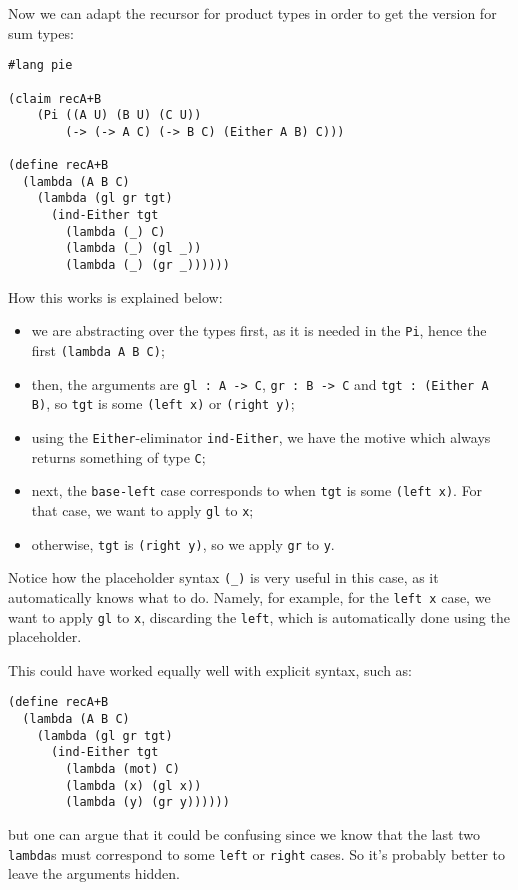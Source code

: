 Now we can adapt the recursor for product types in order to
get the version for sum types:
{
  \small
\begin{verbatim}
#lang pie

(claim recA+B
    (Pi ((A U) (B U) (C U))
        (-> (-> A C) (-> B C) (Either A B) C)))

(define recA+B
  (lambda (A B C)
    (lambda (gl gr tgt)
      (ind-Either tgt
        (lambda (_) C)
        (lambda (_) (gl _))
        (lambda (_) (gr _))))))
\end{verbatim}
}

How this works is explained below:
\begin{itemize}
\item we are abstracting over the types first, as it is needed in the \texttt{Pi},
  hence the first \texttt{(lambda A B C)};
\item then, the arguments are \texttt{gl : A -> C}, \texttt{gr : B -> C} and
  \texttt{tgt : (Either A B)}, so \texttt{tgt} is some \texttt{(left x)} or
  \texttt{(right y)};
\item using the \texttt{Either}-eliminator \texttt{ind-Either}, we have the
  motive which always returns something of type \texttt{C};
\item next, the \texttt{base-left} case corresponds to when \texttt{tgt} is
  some \texttt{(left x)}. For that case, we want to apply \texttt{gl} to \texttt{x};
\item otherwise, \texttt{tgt} is \texttt{(right y)}, so we apply \texttt{gr} to \texttt{y}.
\end{itemize}

Notice how the placeholder syntax \texttt{(\_)} is very useful in this case, as it
automatically knows what to do. Namely, for example, for the \texttt{left x} case,
we want to apply \texttt{gl} to \texttt{x}, discarding the \texttt{left}, which is
automatically done using the placeholder.

This could have worked equally well with explicit syntax, such as:
{
  \small
\begin{verbatim}
(define recA+B
  (lambda (A B C)
    (lambda (gl gr tgt)
      (ind-Either tgt
        (lambda (mot) C)
        (lambda (x) (gl x))
        (lambda (y) (gr y))))))
\end{verbatim}
}
but one can argue that it could be confusing since we know that the last two
\texttt{lambda}s must correspond to some \texttt{left} or \texttt{right} cases.
So it's probably better to leave the arguments hidden.

